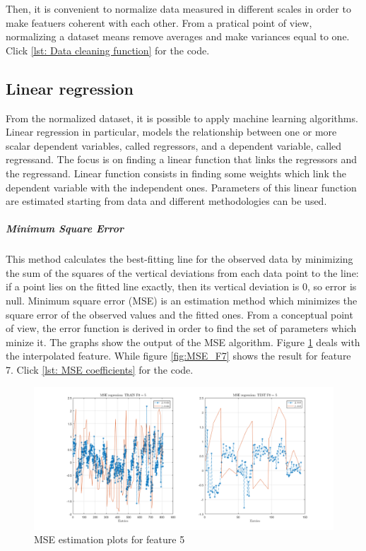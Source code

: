 \documentclass{article}
\begin{document}
Then, it is convenient to normalize data measured in different scales in order to make featuers coherent with each other. From a pratical point of view, normalizing a dataset means remove averages and make variances equal to one.\\
Click \ref{lst: Data cleaning function} for the code.

\subsection{Linear regression}
From the normalized dataset, it is possible to apply machine learning algorithms. \\

Linear regression in particular, models the relationship between one or more scalar dependent variables, called regressors, and a dependent variable, called regressand. The focus is on finding a linear function that links the regressors and the regressand. Linear function consists in finding some weights which link the dependent variable with the independent ones. Parameters of this linear function are estimated starting from data and different methodologies can be used.\\

\subparagraph{Minimum Square Error}
This method calculates the best-fitting line for the observed data by minimizing the sum of the squares of the vertical deviations from each data point to the line: if a point lies on the fitted line exactly, then its vertical deviation is 0, so error is null.
Minimum square error (MSE) is an estimation method which minimizes the square error of the observed values and the fitted ones. From a conceptual point of view, the error function is derived  in order to find the set of parameters which minize it.
The graphs show the output of the MSE algorithm. Figure \ref{fig:MSE_F5} deals with the interpolated feature. While figure \ref{fig:MSE_F7} shows the result for feature 7. Click \ref{lst: MSE coefficients} for the code.

\begin{figure}[H]
	\centering
	\includegraphics[scale=0.3]{pictures/MSE_F5_2.png}
	\caption{MSE estimation plots for feature 5}\label{fig:MSE_F5}
\end{figure}
\end{document}
